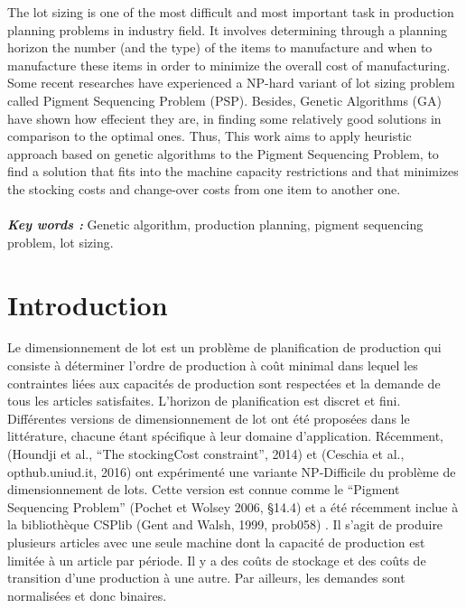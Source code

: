 \documentclass[12pt,a4paper]{article}
\begin{document}
	The lot sizing is one of the most difficult and most important task in production planning problems in industry field. It involves determining through a planning horizon the number (and the type) of the items to manufacture and when to manufacture these items in order to minimize the overall cost of manufacturing. Some recent researches have experienced a NP-hard variant of lot sizing problem called Pigment Sequencing Problem (PSP). Besides, Genetic Algorithms (GA) have shown how effecient they are, in finding some relatively good solutions in comparison to the optimal ones. Thus, This work aims to apply heuristic approach based on genetic algorithms to the Pigment Sequencing Problem, to find a solution that fits into the machine capacity restrictions and that minimizes the stocking costs and change-over costs from one item to another one.\\
	\\
	\hspace*{.5cm}\textsl{\textbf{Key words :}} Genetic algorithm, production planning, pigment sequencing problem, lot sizing.
	
	  
	
	\newpage
	
	\part*{Introduction}
	
	Le dimensionnement de lot est un problème de planification de production qui consiste à déterminer l'ordre de production à coût minimal dans lequel les contraintes liées aux capacités de production sont respectées et la demande de tous les articles satisfaites. L'horizon de planification est discret et fini. Différentes versions de dimensionnement de lot ont été proposées dans le littérature, chacune étant spécifique à leur domaine d'application. Récemment,
(Houndji et al., “The stockingCost constraint”, 2014) et (Ceschia et al., opthub.uniud.it, 2016) ont expérimenté une variante NP-Difficile du problème de dimensionnement de lots. Cette version est connue comme le “Pigment Sequencing Problem” (Pochet et Wolsey 2006, §14.4) et a été récemment inclue à la bibliothèque CSPlib (Gent and Walsh, 1999, prob058) . Il s'agit de produire plusieurs articles avec une seule machine dont la capacité de production est limitée à un article par période. Il y a des coûts de stockage et des coûts de transition d'une production à une autre. Par ailleurs, les demandes sont normalisées et donc binaires.
	
\end{document}
